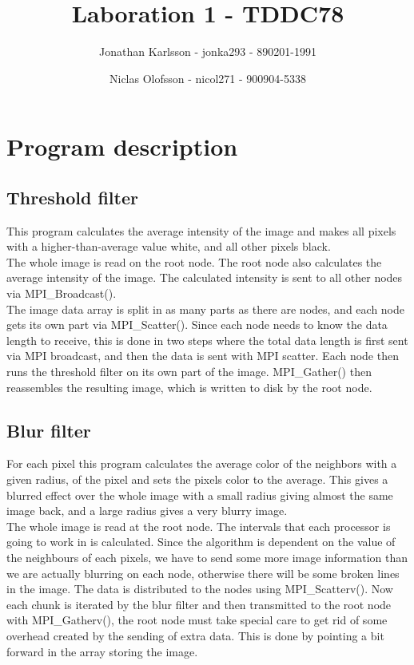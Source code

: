 \documentclass[a4paper]{article}
\author{Jonathan Karlsson - jonka293 - 890201-1991 \and Niclas Olofsson - nicol271 - 900904-5338}
\title{Laboration 1 - TDDC78}
\begin{document}
\maketitle

\section{Program description}
\subsection{Threshold filter}

This program calculates the average intensity of the image and makes all
pixels with a higher-than-average value white, and all other pixels
black.\\

The whole image is read on the root node. The root node also calculates
the  average intensity of the image. The calculated intensity is sent to
all other nodes via MPI\_Broadcast().\\

The image data array is split in as many parts as there are nodes, and
each node gets its own part via MPI\_Scatter(). Since each node needs to
know the data length to receive, this is done in two steps where the
total data length is first sent via MPI broadcast, and then the data is
sent with MPI scatter. Each node then runs the threshold filter on its
own part of the image. MPI\_Gather() then reassembles the resulting image,
which is written to disk by the root node.\\

\subsection{Blur filter}

For each pixel this program calculates the average color of the
neighbors with a given radius, of the pixel and sets the pixels color to
the average. This gives a blurred effect over the whole image with a
small radius giving almost the same image back, and a large radius gives a
very blurry image.\\

The whole image is read at the root node. The intervals that each
processor is going to work in is calculated. Since the algorithm is
dependent on the value of the neighbours of each pixels, we have to send
some more image information than we are actually blurring on each node,
otherwise there will be some broken lines in the image. The data is
distributed to the nodes using MPI\_Scatterv(). Now each chunk is
iterated by the blur filter and then transmitted to the root node with
MPI\_Gatherv(), the root node must take special care to get rid of some
overhead created by the sending of extra data. This is done by pointing
a bit forward in the array storing the image.
\end{document}

